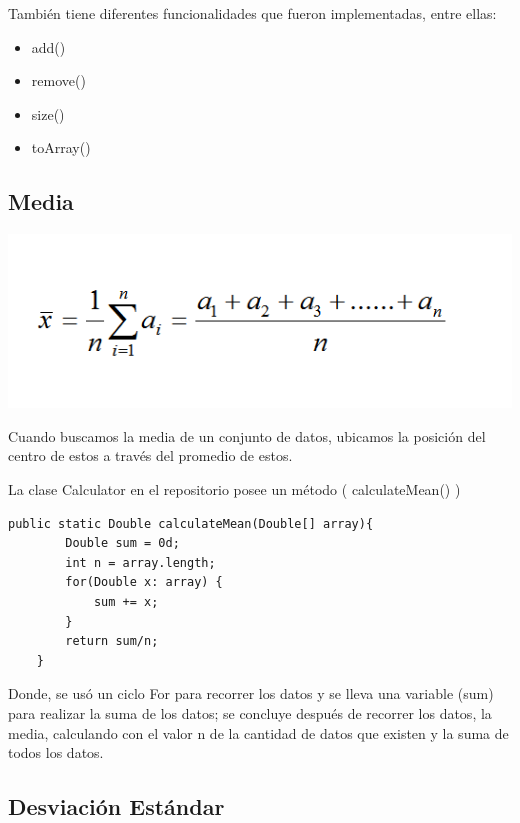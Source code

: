 \documentclass[
	12pt, %
	spanish, %
]{fphw}
\begin{document}
También tiene diferentes funcionalidades que fueron implementadas, entre ellas:

\begin{itemize}
	\item add()
	\item remove()
	\item size()
	\item toArray()
\end{itemize}



\subsection*{Media}



\includegraphics[scale=0.8]{formula-media.png}


Cuando buscamos la media de un conjunto de datos, ubicamos la posición del centro de estos a través del promedio de estos.

La clase Calculator en el repositorio posee un método ( calculateMean() ) 

\begin{verbatim}
public static Double calculateMean(Double[] array){
        Double sum = 0d;
        int n = array.length;
        for(Double x: array) {
            sum += x;
        }
        return sum/n;
    }
\end{verbatim}

Donde, se usó un ciclo For para recorrer los datos y se lleva una variable (sum) para realizar la suma de los datos; se concluye después de recorrer los datos, la media, calculando con el valor n de la cantidad de datos que existen y la suma de todos los datos.

\subsection*{Desviación Estándar}
\end{document}
